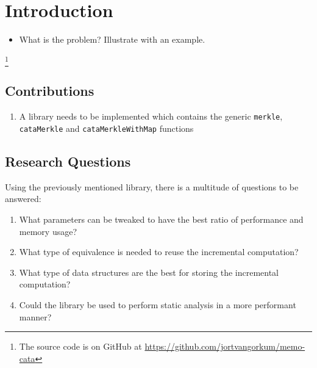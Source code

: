 \section{Introduction}
\begin{itemize}
    \item What is the problem? Illustrate with an example.
\end{itemize}


\footnote{The source code is on GitHub at \hyperlink{https://github.com/jortvangorkum/memo-cata}{https://github.com/jortvangorkum/memo-cata}}

\subsection{Contributions}
\begin{enumerate}[label={(\Alph*)}]
    \item A library needs to be implemented which contains the generic \texttt{merkle}, \texttt{cataMerkle} and \texttt{cataMerkleWithMap} functions
\end{enumerate}

\subsection{Research Questions}
Using the previously mentioned library, there is a multitude of questions to be answered:
\begin{enumerate}[label={(\Alph*)}]
    \item What parameters can be tweaked to have the best ratio of performance and memory usage?
    \item What type of equivalence is needed to reuse the incremental computation?
    \item What type of data structures are the best for storing the incremental computation?
    \item Could the library be used to perform static analysis in a more performant manner?
\end{enumerate}